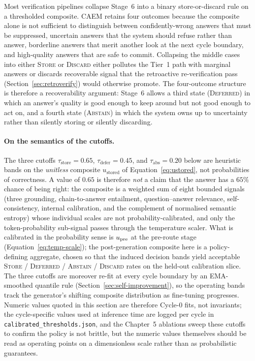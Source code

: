 Most verification pipelines collapse Stage~6 into a binary store-or-discard rule on a thresholded composite. CAEM retains four outcomes because the composite alone is not sufficient to distinguish between confidently-wrong answers that must be suppressed, uncertain answers that the system should refuse rather than answer, borderline answers that merit another look at the next cycle boundary, and high-quality answers that are safe to commit. Collapsing the middle cases into either \textsc{Store} or \textsc{Discard} either pollutes the Tier~1 path with marginal answers or discards recoverable signal that the retroactive re-verification pass (Section~\ref{sec:retroverify}) would otherwise promote. The four-outcome structure is therefore a recoverability argument: Stage~6 allows a third state (\textsc{Deferred}) in which an answer's quality is good enough to keep around but not good enough to act on, and a fourth state (\textsc{Abstain}) in which the system owns up to uncertainty rather than silently storing or silently discarding.

\paragraph{On the semantics of the cutoffs.}
The three cutoffs $\tau_{\text{store}} = 0.65$, $\tau_{\text{defer}} = 0.45$, and $\tau_{\text{abs}} = 0.20$ below are heuristic bands on the \emph{unitless} composite $u_{\text{stored}}$ of Equation~\ref{eq:ustored}, not probabilities of correctness. A value of $0.65$ is therefore \emph{not} a claim that the answer has a $65\%$ chance of being right: the composite is a weighted sum of eight bounded signals (three grounding, chain-to-answer entailment, question--answer relevance, self-consistency, internal calibration, and the complement of normalised semantic entropy) whose individual scales are not probability-calibrated, and only the token-probability sub-signal passes through the temperature scaler. What is calibrated in the probability sense is $u_{\text{pre}}$ at the pre-route stage (Equation~\ref{eq:temp-scale}); the post-generation composite here is a policy-defining aggregate, chosen so that the induced decision bands yield acceptable \textsc{Store} / \textsc{Deferred} / \textsc{Abstain} / \textsc{Discard} rates on the held-out calibration slice. The three cutoffs are moreover re-fit at every cycle boundary by an EMA-smoothed quantile rule (Section~\ref{sec:self-improvement}), so the operating bands track the generator's shifting composite distribution as fine-tuning progresses. Numeric values quoted in this section are therefore Cycle-0 fits, not invariants; the cycle-specific values used at inference time are logged per cycle in \texttt{calibrated\_thresholds.json}, and the Chapter~5 ablations sweep these cutoffs to confirm the policy is not brittle, but the numeric values themselves should be read as operating points on a dimensionless scale rather than as probabilistic guarantees.

